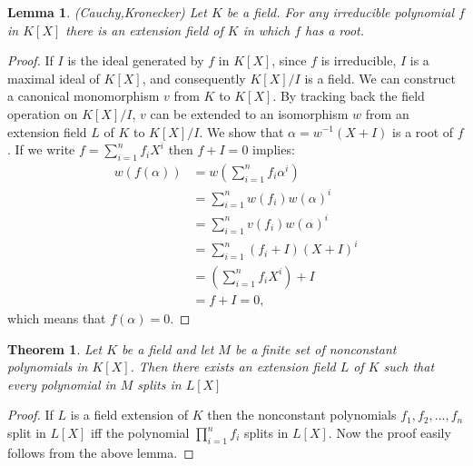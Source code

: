 \documentclass[12pt]{article}
\newtheorem{lemma}{Lemma}
\newtheorem{theorem}{Theorem}
\begin{document}
\begin{lemma}(Cauchy,Kronecker) Let $K$ be a field. For any irreducible polynomial $f$ in $K[X]$ there is an extension field of $K$ in which $f$ has a root.\end{lemma}\begin{proof} If $I$ is the ideal generated by $f$ in $K[X]$, since $f$ is irreducible, $I$ is a maximal ideal of $K[X]$, and consequently $K[X]/I$ is a field.\newline
 We can construct a canonical monomorphism $v$ from $K$ to $K[X]$. By tracking back the field operation on $K[X]/I$, $v$ can be extended to an isomorphism $w$ from an extension field $L$ of $K$ to $K[X]/I$.\newline
 We show that $\alpha = w^{-1}(X+I)$ is a root of $f$.\newline
 If we write $f = \sum_{i = 1}^n f_i X^i$ then $f+I = 0$ implies:
\begin{align*}
w(f(\alpha)) 
&= w(\sum_{i = 1}^n f_i \alpha^i) \\
&= \sum_{i = 1}^n w(f_i) w(\alpha)^i \\
&=  \sum_{i = 1}^n v(f_i) w(\alpha)^i \\
&= \sum_{i = 1}^n (f_i+I)(X+I)^i \\
&= (\sum_{i = 1}^n f_i X^i)+I \\ 
&= f + I = 0,
\end{align*} 
 which means that $f(\alpha) = 0$.\end{proof}
\begin{theorem} Let $K$ be a field and let $M$ be a finite set of nonconstant polynomials in $K[X]$. Then there exists an extension field $L$ of $K$ such that every polynomial in $M$ splits in $L[X]$\end{theorem}\begin{proof} If $L$ is a field extension of $K$ then the nonconstant polynomials $f_1, f_2, ... ,f_n$ split in $L[X]$ iff the polynomial $\prod_{i=1}^n f_i$ splits in $L[X]$. Now the proof easily follows from the above lemma.
\end{proof}

\end{document}
